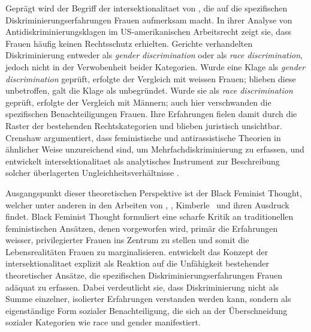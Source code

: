 Geprägt wird der Begriff der \gls{intersektionalitaet} von \textcite{crenshawMappingMarginsIntersectionality1991}, die auf die spezifischen Diskriminierungserfahrungen \emph{}\footnotemark Frauen aufmerksam macht. In ihrer Analyse von Antidiskriminierungsklagen im US-amerikanischen Arbeitsrecht zeigt sie, dass \emph{} Frauen häufig keinen Rechtsschutz erhielten. Gerichte verhandelten Diskriminierung entweder als \emph{\gls{gender} discrimination} oder als \emph{\gls{race} discrimination}, jedoch nicht in der Verwobenheit beider Kategorien. Wurde eine Klage als \emph{\gls{gender} discrimination} geprüft, erfolgte der Vergleich mit weissen Frauen; blieben diese unbetroffen, galt die Klage als unbegründet. Wurde sie als \emph{\gls{race} discrimination} geprüft, erfolgte der Vergleich mit \emph{} Männern; auch hier verschwanden die spezifischen Benachteiligungen \emph{} Frauen. Ihre Erfahrungen fielen damit durch die Raster der bestehenden Rechtskategorien und blieben juristisch unsichtbar. Crenshaw argumentiert, dass feministische und antirassistische Theorien in ähnlicher Weise unzureichend sind, um Mehrfachdiskriminierung zu erfassen, und entwickelt \gls{intersektionalitaet} als analytisches Instrument zur Beschreibung solcher überlagerten Ungleichheitsverhältnisse \parencite[\gls{vgl}][]{hancockWhenMultiplicationDoesnt2007}.


Ausgangspunkt dieser theoretischen Perspektive ist der Black Feminist Thought, welcher unter anderen in den Arbeiten von \textcite{hooksAintWomanBlack1981}, \textcite{lordeSisterOutsiderEssays1984}, Kimberle~\textcite{crenshawMappingMarginsIntersectionality1991} und \textcite{collinsBlackFeministThought2002} ihren Ausdruck findet. Black Feminist Thought formuliert eine scharfe Kritik an traditionellen feministischen Ansätzen, denen vorgeworfen wird, primär die Erfahrungen weisser, privilegierter Frauen ins Zentrum zu stellen und somit die Lebensrealitäten \emph{} Frauen zu marginalisieren. \textcite{crenshawMappingMarginsIntersectionality1991} entwickelt das Konzept der \gls{intersektionalitaet} explizit als Reaktion auf die Unfähigkeit bestehender theoretischer Ansätze, die spezifischen Diskriminierungserfahrungen \emph{} Frauen adäquat zu erfassen. Dabei verdeutlicht sie, dass Diskriminierung nicht als Summe einzelner, isolierter Erfahrungen verstanden werden kann, sondern als eigenständige Form sozialer Benachteiligung, die sich an der Überschneidung sozialer Kategorien wie \gls{race} und \gls{gender} manifestiert.


